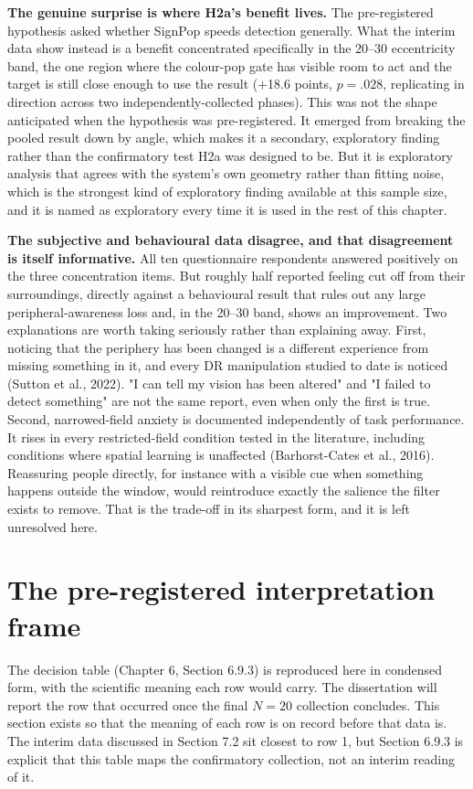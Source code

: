 \textbf{The genuine surprise is where H2a's benefit lives.} The pre-registered hypothesis asked
whether SignPop speeds detection generally. What the interim data show instead is a benefit
concentrated specifically in the 20–30\textdegree{} eccentricity band, the one region where the
colour-pop gate has visible room to act and the target is still close enough to use the result
(+18.6 points, $p = .028$, replicating in direction across two independently-collected phases). This
was not the shape anticipated when the hypothesis was pre-registered. It emerged from breaking the
pooled result down by angle, which makes it a secondary, exploratory finding rather than the
confirmatory test H2a was designed to be. But it is exploratory analysis that agrees with the system's own geometry rather than fitting
noise, which is the strongest kind of exploratory finding available at this sample size, and it is
named as exploratory every time it is used in the rest of this chapter.

\textbf{The subjective and behavioural data disagree, and that disagreement is itself informative.}
All ten questionnaire respondents answered positively on the three concentration items. But roughly
half reported feeling cut off from their surroundings, directly against a behavioural result that
rules out any large peripheral-awareness loss and, in the 20–30\textdegree{} band, shows an
improvement. Two explanations are worth taking seriously rather than explaining away. First, noticing
that the periphery has been changed is a different experience from missing something in it, and every
DR manipulation studied to date is noticed (Sutton et al., 2022). "I can tell my vision has been
altered" and "I failed to detect something" are not the same report, even when only the first is
true. Second, narrowed-field anxiety is documented independently of task performance. It rises in
every restricted-field condition tested in the literature, including conditions where spatial learning
is unaffected (Barhorst-Cates et al., 2016). Reassuring people directly, for instance with a visible
cue when something happens outside the window, would reintroduce exactly the salience the filter
exists to remove. That is the trade-off in its sharpest form, and it is left unresolved here.

\section{The pre-registered interpretation frame}

The decision table (Chapter 6, Section 6.9.3) is reproduced here in condensed form, with the
scientific meaning each row would carry. The dissertation will report the row that occurred once the
final $N = 20$ collection concludes. This section exists so that the meaning of each row is on record
before that data is. The interim data discussed in Section 7.2 sit closest to row 1, but Section 6.9.3
is explicit that this table maps the confirmatory collection, not an interim reading of it.

